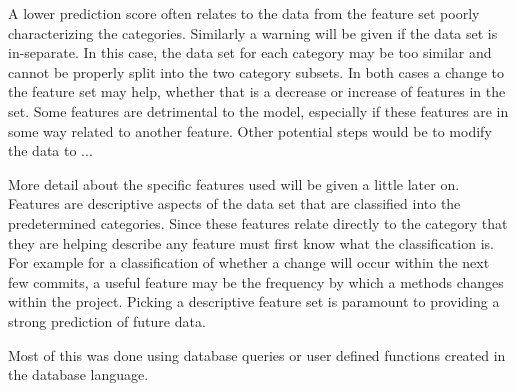 A lower prediction score often relates to the data from the feature set poorly characterizing the categories. Similarly a warning will be given if the data set is in-separate. In this case, the data set for each category may be too similar and cannot be properly split into the two category subsets. In both cases a change to the feature set may help, whether that is a decrease or increase of features in the set. Some features are detrimental to the model, especially if these features are in some way related to another feature. Other potential steps would be to modify the data to ...

More detail about the specific features used will be given a little later on. Features are descriptive aspects of the data set that are classified into the predetermined categories. Since these features relate directly to the category that they are helping describe any feature must first know what the classification is. For example for a classification of whether a change will occur within the next few commits, a useful feature may be the frequency by which a methods changes within the project. Picking a descriptive feature set is paramount to providing a strong prediction of future data.


Most of this was done using database queries or user defined functions created in the database language.